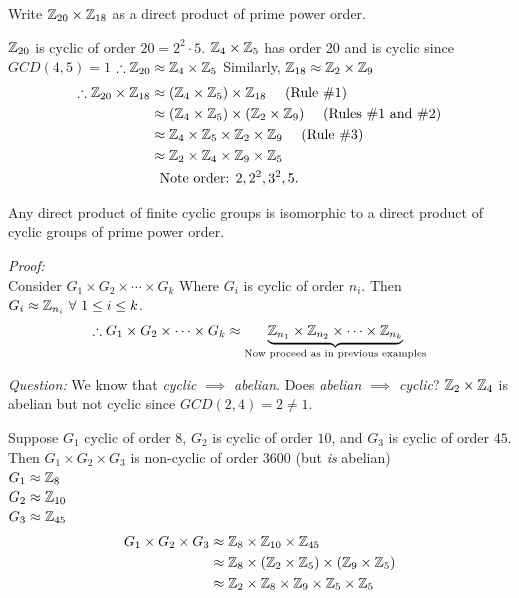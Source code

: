 \begin{example}
Write ${\mathbb{Z}}_{20}\times {\mathbb{Z}}_{18}$ as a direct product of prime power order.

${\mathbb{Z}}_{20}$ is cyclic of order $20=2^2\cdot 5$.
${\mathbb{Z}}_4\times{\mathbb{Z}}_5$ has order 20 and is cyclic since $GCD(4,5)=1$
$\therefore {\mathbb{Z}}_{20}\approx {\mathbb{Z}}_4\times {\mathbb{Z}}_5$
Similarly, ${\mathbb{Z}}_{18}\approx {\mathbb{Z}}_2\times {\mathbb{Z}}_9$
\begin{align}
    \therefore \Z_{20}\times \Z_{18} &\approx (\Z_4\times \Z_5)\times \Z_{18} \ \ \ \ \text{(Rule \#1)} \nonumber \\
    &\approx (\Z_4\times \Z_5)\times (\Z_{2}\times \Z_9) \ \ \ \ \text{(Rules \#1 and \#2)} \nonumber \\
    &\approx \Z_4\times \Z_5\times \Z_{2}\times \Z_9 \ \ \ \ \text{(Rule \#3)} \nonumber \\
    &\approx \Z_2\times \Z_4\times \Z_9 \times \Z_5 \nonumber \\
    & \ \ \text{Note order: }2,2^2, 3^2, 5. \nonumber
\end{align}
\end{example}

\begin{corollary}
Any direct product of finite cyclic groups is isomorphic to a direct product of cyclic groups of
prime power order. \steezybreak

\noindent \textit{Proof:}\\
Consider $G_1\times G_2 \times \cdots \times G_k$ Where $G_i$ is cyclic of order $n_i$. Then
$G_i\approx {\mathbb{Z}}_{n_i} \ \forall \ 1\leq i \leq k$.
\begin{align}
    \therefore G_1\times G_2\times \cdots \times G_k \approx \underbrace{{\mathbb{Z}}_{n_1}\times {\mathbb{Z}}_{n_2}\times \cdots \times {\mathbb{Z}}_{n_k}}_{\text{Now proceed as in previous examples}} \nonumber
\end{align}
\end{corollary}

\textit{Question:} We know that \textit{cyclic} $\implies$ \textit{abelian}. Does \textit{abelian}
$\implies$ \textit{cyclic}?  ${\mathbb{Z}}_2\times {\mathbb{Z}}_4$ is abelian but not cyclic since
$GCD(2,4)=2\neq 1$.

\begin{example}
Suppose $G_1$ cyclic of order $8$, $G_2$ is cyclic of order $10$, and $G_3$ is cyclic of order $45$.
\\
Then $G_1\times G_2\times G_3$ is non-cyclic of order $3600$ (but \textit{is} abelian) \\
$G_1\approx {\mathbb{Z}}_8$ \\
$G_2 \approx {\mathbb{Z}}_{10}$ \\
$G_3\approx {\mathbb{Z}}_{45}$
\begin{align}
    G_1\times G_2\times G_3 &\approx {\mathbb{Z}}_8\times {\mathbb{Z}}_{10}\times {\mathbb{Z}}_{45} \nonumber \\
    &\approx {\mathbb{Z}}_8\times ({\mathbb{Z}}_2\times {\mathbb{Z}}_5)\times({\mathbb{Z}}_9\times {\mathbb{Z}}_5) \nonumber \\
    &\approx {\mathbb{Z}}_2\times {\mathbb{Z}}_8\times {\mathbb{Z}}_9\times {\mathbb{Z}}_5 \times {\mathbb{Z}}_5 \nonumber
\end{align}
\end{example}


